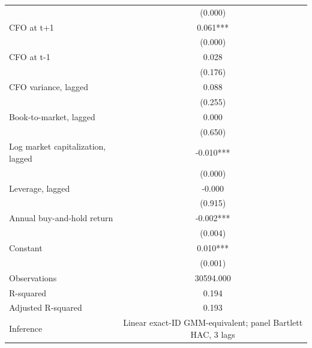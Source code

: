 {\begin{tabular}{l*{1}{c}}
                    &     (0.000)   \\
CFO at t+1          &       0.061***\\
                    &     (0.000)   \\
CFO at t-1          &       0.028   \\
                    &     (0.176)   \\
CFO variance, lagged&       0.088   \\
                    &     (0.255)   \\
Book-to-market, lagged&       0.000   \\
                    &     (0.650)   \\
Log market capitalization, lagged&      -0.010***\\
                    &     (0.000)   \\
Leverage, lagged    &      -0.000   \\
                    &     (0.915)   \\
Annual buy-and-hold return&      -0.002***\\
                    &     (0.004)   \\
Constant            &       0.010***\\
                    &     (0.001)   \\
\hline
Observations        &   30594.000   \\
R-squared           &       0.194   \\
Adjusted R-squared  &       0.193   \\
Inference           &Linear exact-ID GMM-equivalent; panel Bartlett HAC, 3 lags   \\
\hline\hline
\end{tabular}
}
